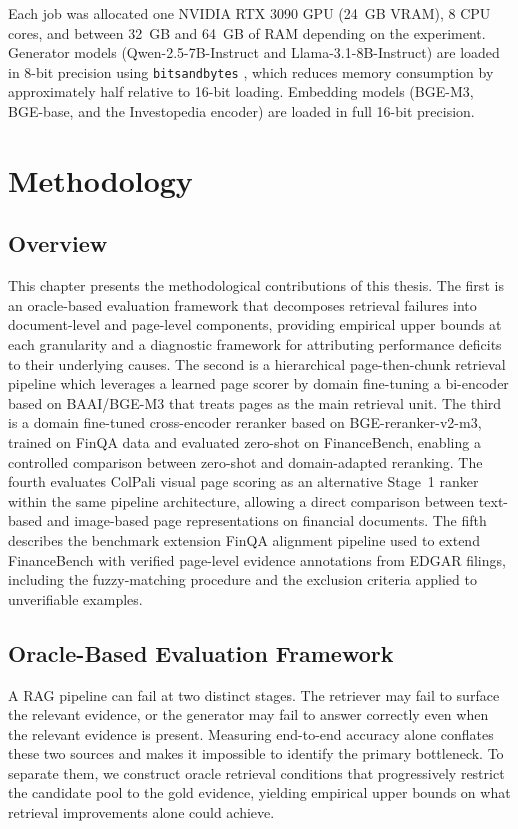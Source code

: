 \documentclass[12pt,twoside,maitrise]{dms}
\newcounter{example}
\theoremstyle{definition}
\numberwithin{equation}{section}
\numberwithin{table}{chapter}
\numberwithin{figure}{chapter}
\begin{document}
Each job was allocated one NVIDIA RTX 3090 GPU (24~GB VRAM), 8 CPU cores, and between
32~GB and 64~GB of RAM depending on the experiment. Generator models
(Qwen-2.5-7B-Instruct and Llama-3.1-8B-Instruct) are loaded in 8-bit precision using
\texttt{bitsandbytes} \citep{dettmers2022llmint8}, which reduces memory consumption by
approximately half relative to 16-bit loading. Embedding models (BGE-M3, BGE-base, and
the Investopedia encoder) are loaded in full 16-bit precision.



\chapter{Methodology}
\label{chap:methodology}


\section{Overview}
This chapter presents the methodological contributions of this thesis. The first is an oracle-based evaluation framework that decomposes retrieval failures into document-level and page-level components, providing empirical upper bounds at each granularity and a diagnostic framework for attributing performance deficits to their underlying causes. The second is a hierarchical page-then-chunk
retrieval pipeline which leverages a learned page scorer by domain fine-tuning a bi-encoder
based on BAAI/BGE-M3 that treats pages as the main retrieval unit. The third is a domain fine-tuned cross-encoder reranker based on
BGE-reranker-v2-m3, trained on FinQA data and evaluated zero-shot on
FinanceBench, enabling a controlled comparison between zero-shot and domain-adapted
reranking. The fourth evaluates ColPali visual page scoring as an alternative Stage~1
ranker within the same pipeline architecture, allowing a direct comparison between
text-based and image-based page representations on financial documents. The fifth describes the benchmark extension FinQA alignment pipeline used to extend FinanceBench with verified page-level evidence annotations from EDGAR filings, including the fuzzy-matching procedure and
the exclusion criteria applied to unverifiable examples. 

\section{Oracle-Based Evaluation Framework}
\label{sec:oracle_eval}
A RAG pipeline can fail at two distinct stages. The retriever may fail to surface the
relevant evidence, or the generator may fail to answer correctly even when the relevant
evidence is present.  Measuring end-to-end accuracy alone conflates these two sources
and makes it impossible to identify the primary bottleneck.  To separate them, we
construct oracle retrieval conditions that progressively restrict the candidate pool to
the gold evidence, yielding empirical upper bounds on what retrieval improvements alone
could achieve.
\end{document}

